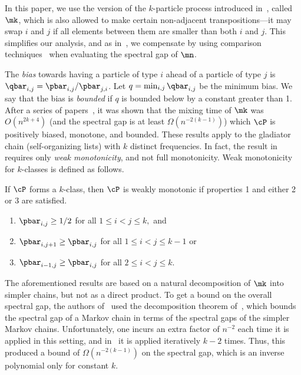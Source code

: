 \documentclass{toc}
\begin{document}
In this paper, we use the version of the $k$-particle process 
introduced in~\cite{MS}, called $\mk$, which is also allowed to make 
certain non-adjacent transpositions---it may swap $i$ and $j$ if all 
elements between them are smaller than both $i$ and $j$.  This 
simplifies our analysis, and as in~\cite{MS}, we compensate by using 
comparison techniques~\cite{dsc, RT98} when evaluating the spectral gap 
of $\mn$.
 
The \emph{bias} towards having a particle of type $i$ ahead of a 
particle of type $j$ is $\qbar_{i,j} = \pbar_{i,j}/\pbar_{j,i}$.  Let 
$q=\min_{i,j}\qbar_{i,j}$ be the minimum bias. We say that the bias is 
\emph{bounded} if $q$ is bounded below by a constant greater than 1. 
After a series of papers~\cite{HW16,MS}, it was shown that the mixing time
of $\mk$ was $O(n^{2k+4})$ (and the spectral 
gap is at least $\Omega(n^{-2(k-1)})$) 
which $\cP$ is positively biased, monotone, and bounded. %
%
%
%
%
%
%
These results apply to the 
gladiator chain (self-organizing lists) with $k$ distinct frequencies.  
In fact, the result in~\cite{MS} requires only \emph{weak 
monotonicity}, and not full monotonicity.  Weak monotonicity for 
$k$-classes is defined as follows.

\begin{definition}\label{mono} If $\cP$ forms a $k$-class, 
then $\cP$ is weakly monotonic if properties 1 and either 2 or 3 are satisfied.
\begin{enumerate}
\item $\pbar_{i,j} \geq 1/2$ for all $1 \leq i < j \leq k,$ and
\item $\pbar_{i,j+1} \geq \pbar_{i,j}$ for all $1 \leq i < j \leq k-1$ or
\item $\pbar_{i-1,j} \geq \pbar_{i,j}$ for all $2 \leq i < j \leq k.$
\end{enumerate}
\end{definition}

The aforementioned results are based on a natural decomposition of 
$\mk$ into simpler chains, but not as a direct product. To get a bound 
on the overall spectral gap, the authors of~\cite{MS} used the 
decomposition theorem of~\cite{MR00}, which bounds the spectral gap of 
a Markov chain in terms of the spectral gaps of the simpler Markov 
chains. Unfortunately, one incurs an extra factor of $n^{-2}$ each time 
it is applied in this setting, and in~\cite{MS} it is applied 
iteratively $k-2$ times. Thus, this produced a bound
%
of $\Omega(n^{-2(k-1)})$ on the spectral gap,
which is an inverse polynomial only for constant $k$.
\end{document}
